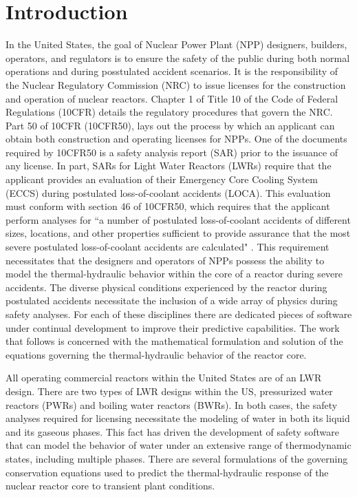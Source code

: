 \chapter{Introduction}
\label{chap:intro}
In the United States, the goal of Nuclear Power Plant (NPP) designers, builders, operators, and regulators is to ensure the safety of the public during both normal operations and during posstulated accident scenarios.
It is the responsibility of the Nuclear Regulatory Commission (NRC) to issue licenses for the construction and operation of nuclear reactors.
Chapter 1 of Title 10 of the Code of Federal Regulations (10CFR) details the regulatory procedures that govern the NRC.
Part 50 of 10CFR (10CFR50), lays out the process by which an applicant can obtain both construction and operating licenses for NPPs.
One of the documents required by 10CFR50 is a safety analysis report (SAR) prior to the issuance of any license.
In part, SARs for Light Water Reactors (LWRs) require that the applicant provides an evaluation of their Emergency Core Cooling System (ECCS) during postulated loss-of-coolant accidents (LOCA).
This evaluation must conform with section 46 of 10CFR50, which requires that the applicant perform analyses for ``a number of postulated loss-of-coolant accidents of different sizes, locations, and other properties sufficient to provide assurance that the most severe postulated loss-of-coolant accidents are calculated" \cite{CFR10}.
This requirement necessitates that the designers and operators of NPPs possess the ability to model the thermal-hydraulic behavior within the core of a reactor during severe accidents.  
The diverse physical conditions experienced by the reactor during postulated accidents necessitate the inclusion of a wide array of physics during safety analyses.
For each of these disciplines there are dedicated pieces of software under continual development to improve their predictive capabilities.
The work that follows is concerned with the mathematical formulation and solution of the equations governing the thermal-hydraulic behavior of the reactor core.

All operating commercial reactors within the United States are of an LWR design.
There are two types of LWR designs within the US, pressurized water reactors (PWRs) and boiling water reactors (BWRs).
In both cases, the safety analyses required for licensing necessitate the modeling of water in both its liquid and its gaseous phases.
This fact has driven the development of safety software that can model the behavior of water under an extensive range of thermodynamic states, including multiple phases.
There are several formulations of the governing conservation equations used to predict the thermal-hydraulic response of the nuclear reactor core to transient plant conditions.

